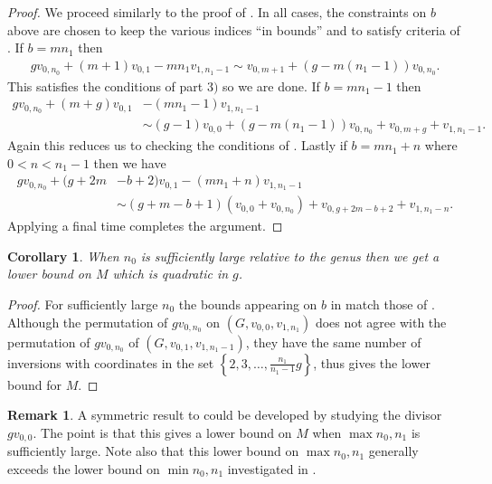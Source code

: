 \documentclass[11pt]{article}
\newtheorem{coro}[theo]{Corollary}
\theoremstyle{definition}
\newtheorem{rema}[theo]{Remark}
\numberwithin{equation}{section}
\newcommand{\set}[1]{\left\{{#1}\right\}}
\begin{document}
\begin{proof}
    We proceed similarly to the proof of . In all cases, the constraints on $b$ above are chosen to keep the various indices ``in bounds'' and to satisfy criteria of . If $b = mn_1$ then
    \begin{align*}
        gv_{0,n_0}+(m+1)v_{0,1}-mn_1v_{1,n_1-1} \sim v_{0,m+1} + (g-m(n_1-1))v_{0,n_0}.
    \end{align*}
    This satisfies the conditions of  part $3)$ so we are done. If $b = mn_1-1$ then
    \begin{align*}
        gv_{0,n_0}+(m+g)v_{0,1}&-(mn_1-1)v_{1,n_1-1} \\&\sim (g-1)v_{0,0} + (g-m(n_1-1))v_{0,n_0}+v_{0,m+g}+v_{1,n_1-1}.
    \end{align*}
    Again this reduces us to checking the conditions of .
    Lastly if $b = mn_1 +n$ where $0<n<n_1-1$ then we have
    \begin{align*}
        gv_{0,n_0}+(g+2m&-b+2)v_{0,1}-(mn_1+n)v_{1,n_1-1} \\
        &\sim (g+m-b+1)(v_{0,0}+v_{0,n_0}) + v_{0,g+2m-b+2} + v_{1,n_1-n}.
    \end{align*}
    Applying  a final time completes the argument.
\end{proof}

\begin{coro}\label{cor-bothOffMax}
    When $n_0$ is sufficiently large relative to the genus then we get a lower bound on $M$ which is quadratic in $g$.
\end{coro}

\begin{proof}
    For sufficiently large $n_0$ the bounds appearing on $b$ in  match those of . Although the permutation of $gv_{0,n_0}$ on $(G,v_{0,0},v_{1,n_1})$ does not agree with the permutation of $gv_{0,n_0}$ of $(G,v_{0,1},v_{1,n_1-1})$, they have the same number of inversions with coordinates in the set $\set{2,3,\dots,\frac{n_1}{n_1-1}g}$, thus  gives the lower bound for $M$.
\end{proof}

\begin{rema}
    A symmetric result to  could be developed by studying the divisor $gv_{0,0}$. The point is that this gives a lower bound on $M$ when $\max{n_0,n_1}$ is sufficiently large. Note also that this lower bound on $\max{n_0,n_1}$ generally exceeds the lower bound on $\min{n_0,n_1}$ investigated in .
\end{rema}
\end{document}
